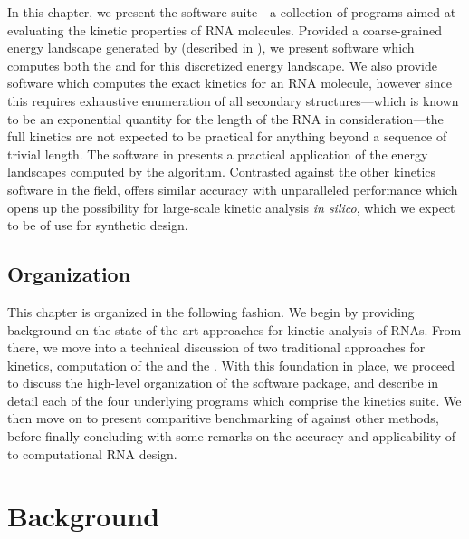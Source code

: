 \documentclass[11pt, oneside]{Thesis} %
\begin{document}
In this chapter, we present the \hermes software suite---a collection of
programs aimed at evaluating the kinetic properties of RNA molecules.
Provided a coarse-grained energy landscape generated by \ffttwo (described
in ), we present software which computes both the \mfpt
and \eqt for this discretized energy landscape. We also provide software which
computes the exact kinetics for an RNA molecule, however since this requires
exhaustive enumeration of all secondary structures---which is known to be an
exponential quantity for the length of the RNA in consideration---the full
kinetics are not expected to be practical for anything beyond a sequence of
trivial length. The software in \hermes presents a practical application of
the energy landscapes computed by the \ffttwo algorithm. Contrasted against
the other kinetics software in the field, \hermes offers similar accuracy
with unparalleled performance which opens up the possibility for large-scale
kinetic analysis {\em in silico}, which we expect to be of use for synthetic
design.

\subsection{Organization}
\label{subsec:hermes:org}

This chapter is organized in the following fashion. We begin by providing
background on the state-of-the-art approaches for kinetic analysis of RNAs.
From there, we move into a technical discussion of two traditional approaches
for kinetics, computation of the \mfpt and the \eqt. With this foundation in
place, we proceed to discuss the high-level organization of the \hermes
software package, and describe in detail each of the four underlying programs
which comprise the kinetics suite. We then move on to present comparitive
benchmarking of \hermes against other methods, before finally concluding with
some remarks on the accuracy and applicability of \hermes to computational
RNA design.

\section{Background}
\label{sec:hermes:bkgrnd}
\end{document}
